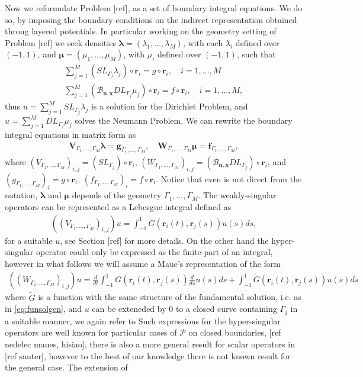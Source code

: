 \documentclass{article}
\newcommand{\todo}[1]{{\color{red}[#1]}}
\newcommand{\bmu} {\bm{\mu}}
\newcommand{\bg}{\bm{g}}
\newcommand{\bla}{\boldsymbol \lambda}
\newcommand{\bn}{\bm{n}}
\newcommand{\br}{\bm{r}}
\newcommand{\bx}{\bm{x}}
\begin{document}
Now we reformulate Problem \todo{ref}, as a set of boundary integral equations. We do so, by imposing the boundary conditions on the indirect representation obtained throug layered potentials. In particular working on the geometry setting of Problem \todo{ref} we seek densities $\bla = (\lambda_1,\hdots,\lambda_M)$, with each $\lambda_i$ defined over $(-1,1)$, and $\bmu = (\mu_1, \hdots, \mu_M)$, with $\mu_i$ defined over $(-1,1)$, such that
\begin{align*}
\sum_{j=1}^M (SL_{\Gamma_j} \lambda_j )\circ \br_i = g\circ \br_i, \quad i = 1,\hdots,M \\
\sum_{j=1}^M (\mathcal{B}_{\bn,\bx}DL_{\Gamma_j} \mu_j )\circ \br_i = f\circ \br_i, \quad i = 1,\hdots,M,
\end{align*}
 thus $u = \sum_{j=1}^M SL_{\Gamma_j} \lambda_j $ is a solution for the Dirichlet Problem, and  $u = \sum_{j=1}^M DL_{\Gamma_j} \mu_j $ solves the Neumann Problem. We can rewrite the boundary integral equations in matrix form as 
\begin{align}
\label{eq:bios}
\mathbf{V}_{\Gamma_1,\hdots,\Gamma_M} \bla = \bg_{\Gamma_1,\hdots,\Gamma_M}, \quad \mathbf{W}_{\Gamma_1,\hdots,\Gamma_M} \bmu = \mathbf{f}_{\Gamma_1,\hdots,\Gamma_M},
\end{align}
where $(V_{\Gamma_1,\hdots,\Gamma_M})_{i,j} = (SL_{\Gamma_j}  )\circ \br_i$, $(W_{\Gamma_1,\hdots,\Gamma_M})_{i,j} = (\mathcal{B}_{\bn,\bx}DL_{\Gamma_j} )\circ \br_i$, and $(g_{\Gamma_1,\hdots,\Gamma_M})_i = g \circ \br_i$, $(f_{\Gamma_1,\hdots,\Gamma_M})_i = f \circ \br_i$. Notice that even is not direct from the notation, $\bla$ and $\bmu$ depends of the geometry $\Gamma_1,\hdots,\Gamma_M$. The weakly-singular operators can be represented as a Lebesgue integral defined as 
\begin{align*}
((V_{\Gamma_1,\hdots,\Gamma_M})_{i,j})u = \int_{-1}^1G(\br_i(t),\br_j(s)) u(s) ds,
\end{align*}
for a suitable $u$, see Section \todo{ref} for more details. On the other hand the hyper-singular operator could only be expressed as the finite-part of an integral, however in what follows we will assume a Maue's representation of the form 
\begin{align*}
((W_{\Gamma_1,\hdots,\Gamma_M})_{i,j})u =  \frac{d}{dt}\int_{-1}^1G(\br_i(t),\br_j(s)) \frac{d}{ds}u(s) ds + 
\int_{-1}^1\widetilde{G}(\br_i(t),\br_j(s))u(s) ds
\end{align*} 
where $\widetilde{G}$ is a function with the same structure of the fundamental solution, i.e. as in \eqref{eq:funsolgen}, and $u$ can be exteneded by 0 to a closed curve containing $\Gamma_j$ in a suitable manner, we again refer to  Such expressions for the hyper-singular operators are well known for particular cases of $\mathcal{P}$ on closed boundaries, \todo{ref nedelec maues, hisiao}, there is also a more general result for scalar operators in \todo{ref sauter}, however to the best of our knowledge there is not known result for the general case. The extension of 
\end{document}
